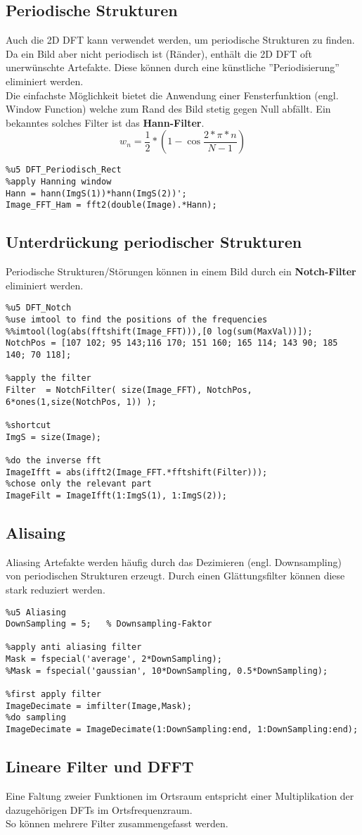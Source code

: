 \subsection{Periodische Strukturen}
Auch die 2D DFT kann verwendet werden, um periodische Strukturen zu finden.
Da ein Bild aber nicht periodisch ist (Ränder), enthält die 2D DFT oft unerwünschte Artefakte. Diese können durch eine künstliche ''Periodisierung'' eliminiert werden.\\
Die einfachste Möglichkeit bietet die Anwendung einer Fensterfunktion (engl. Window Function) welche zum Rand des Bild stetig gegen Null abfällt. Ein bekanntes solches Filter ist das \textbf{Hann-Filter}.
\begin{equation}
w_n=\frac{1}{2}*(1-\cos{\frac{2*\pi *n}{N-1}})
\end{equation}
\begin{lstlisting}
%u5 DFT_Periodisch_Rect
%apply Hanning window
Hann = hann(ImgS(1))*hann(ImgS(2))';
Image_FFT_Ham = fft2(double(Image).*Hann);
\end{lstlisting}

\subsection{Unterdrückung periodischer Strukturen}
Periodische Strukturen/Störungen können in einem Bild durch ein \textbf{Notch-Filter} eliminiert werden.
\begin{lstlisting}
%u5 DFT_Notch
%use imtool to find the positions of the frequencies
%%imtool(log(abs(fftshift(Image_FFT))),[0 log(sum(MaxVal))]);
NotchPos = [107 102; 95 143;116 170; 151 160; 165 114; 143 90; 185 140; 70 118];

%apply the filter 
Filter  = NotchFilter( size(Image_FFT), NotchPos, 6*ones(1,size(NotchPos, 1)) );

%shortcut
ImgS = size(Image);

%do the inverse fft
ImageIfft = abs(ifft2(Image_FFT.*fftshift(Filter)));
%chose only the relevant part
ImageFilt = ImageIfft(1:ImgS(1), 1:ImgS(2));
\end{lstlisting}

\subsection{Alisaing}
Aliasing Artefakte werden häufig durch das Dezimieren (engl. Downsampling) von periodischen Strukturen erzeugt. Durch einen Glättungsfilter können diese stark reduziert werden.
\begin{lstlisting}
%u5 Aliasing
DownSampling = 5;   % Downsampling-Faktor

%apply anti aliasing filter
Mask = fspecial('average', 2*DownSampling);
%Mask = fspecial('gaussian', 10*DownSampling, 0.5*DownSampling);

%first apply filter
ImageDecimate = imfilter(Image,Mask);
%do sampling
ImageDecimate = ImageDecimate(1:DownSampling:end, 1:DownSampling:end);
\end{lstlisting}

\subsection{Lineare Filter und DFFT}
Eine Faltung zweier Funktionen im Ortsraum entspricht einer Multiplikation der dazugehörigen DFTs im Ortsfrequenzraum.\\
So können mehrere Filter zusammengefasst werden.